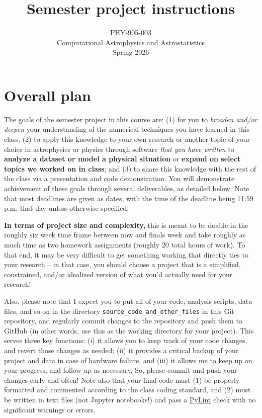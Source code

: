 \documentclass[10pt]{article}
\title{Semester project instructions}
\author{PHY-905-003\\Computational Astrophysics and
  Astrostatistics\\Spring 2026}
\date{} %
\begin{document}
 
\maketitle

\vspace{-10mm}

\section{Overall plan}

The goals of the semester project in this course are: (1) for you to
\textit{broaden and/or deepen} your understanding of the numerical
techniques you have learned in this class, (2) to apply this knowledge
to your own research or another topic of your choice in astrophysics
or physics through software \textit{that you have written} to
\textbf{analyze a dataset or model a physical situation} or
\textbf{expand on select topics we worked on in class}; and (3) to
share this knowledge with the rest of the class via a presentation and
code demonstration.  You will demonstrate achievement of these goals
through several deliverables, as detailed below.  Note that most
deadlines are given as dates, with the time of the deadline being
11:59 p.m. that day unless otherwise specified.

\textbf{In terms of project size and complexity,} this is meant to be
doable in the roughly six week time frame between now and finals week
and take roughly as much time as two homework assignments (roughly 20
total hours of work).  To that end, it may be very difficult to get
something working that directly ties to your research -- in that case,
you should choose a project that is a simplified, constrained, and/or
idealized version of what you'd actually need for your research!

Also, please note that I expect you to put all of your code, analysis
scripts, data files, and so on in the directory
\texttt{source\_code\_and\_other\_files} in this Git repository, and
regularly commit changes to the repository and push them to GitHub (in
other words, use this as the working directory for your project).
This serves three key functions: (i) it allows you to keep track of
your code changes, and revert those changes as needed; (ii) it
provides a critical backup of your project and data in case of
hardware failure, and (iii) it allows me to keep up on your progress,
and follow up as necessary.  So, please commit and push your changes
early and often!  Note also that your final code must (1) be properly
formatted and commented according to the class coding standard, and
(2) must be written in text files (not Jupyter notebooks!) and pass a
\href{https://pypi.org/project/pylint/}{PyLint} check with no
significant warnings or errors.
\end{document}
